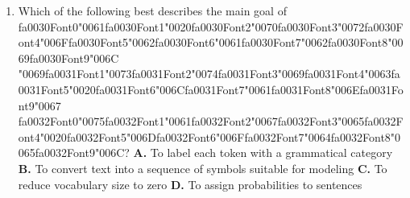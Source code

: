 \documentclass[11pt]{article}
\begin{document}
\begin{enumerate}[leftmargin=*]
  \item Which of the following best describes the main goal of {\csname fa0030Font0\endcsname\char"0061}{\csname fa0030Font1\endcsname\char"0020}{\csname fa0030Font2\endcsname\char"0070}{\csname fa0030Font3\endcsname\char"0072}{\csname fa0030Font4\endcsname\char"006F}{\csname fa0030Font5\endcsname\char"0062}{\csname fa0030Font6\endcsname\char"0061}{\csname fa0030Font7\endcsname\char"0062}{\csname fa0030Font8\endcsname\char"0069}{\csname fa0030Font9\endcsname\char"006C} {\char"0069}{\csname fa0031Font1\endcsname\char"0073}{\csname fa0031Font2\endcsname\char"0074}{\csname fa0031Font3\endcsname\char"0069}{\csname fa0031Font4\endcsname\char"0063}{\csname fa0031Font5\endcsname\char"0020}{\csname fa0031Font6\endcsname\char"006C}{\csname fa0031Font7\endcsname\char"0061}{\csname fa0031Font8\endcsname\char"006E}{\csname fa0031Font9\endcsname\char"0067} {\csname fa0032Font0\endcsname\char"0075}{\csname fa0032Font1\endcsname\char"0061}{\csname fa0032Font2\endcsname\char"0067}{\csname fa0032Font3\endcsname\char"0065}{\csname fa0032Font4\endcsname\char"0020}{\csname fa0032Font5\endcsname\char"006D}{\csname fa0032Font6\endcsname\char"006F}{\csname fa0032Font7\endcsname\char"0064}{\csname fa0032Font8\endcsname\char"0065}{\csname fa0032Font9\endcsname\char"006C}?
    \textbf{A.} To label each token with a grammatical category
    \textbf{B.} To convert text into a sequence of symbols suitable for modeling
    \textbf{C.} To reduce vocabulary size to zero
    \textbf{D.} To assign probabilities to sentences


\end{enumerate}
\end{document}
